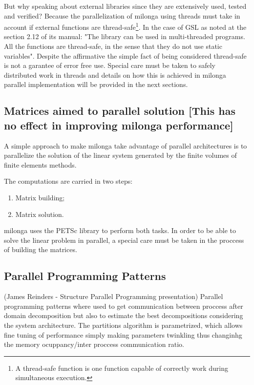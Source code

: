 \documentclass{anstrans}
\begin{document}
But why speaking about external libraries since they are extensively used, tested and verified? Because
the parallelization of milonga using threads must take in account if external functions are
thread-safe\footnote{A thread-safe function is one function capable of correctly work during simultaneous
  execution.}. In the case of GSL as noted at the section 2.12 of its manual: "The library can be used in multi-threaded programs. All the functions are thread-safe, in the sense that they do not use static variables". Despite the affirmative the
simple fact of being considered thread-safe is not a garantee of error free use. Special care must be taken to safely
distributed work in threads and details on how this is achieved in milonga parallel implementation will be provided
in the next sections.

\subsection{Matrices aimed to parallel solution [This has no effect in improving milonga performance]}
A simple approach to make milonga take advantage of parallel architectures is to parallelize the
solution of the linear system generated by the finite volumes of finite elements methods.

The computations are carried in two steps:
\begin{enumerate}
\item Matrix building;
  \item Matrix solution.
\end{enumerate}

milonga uses the PETSc library to perform both tasks. In order to be able to solve the linear problem
in parallel, a special care must be taken in the proccess of building the matrices.


\subsection{Parallel Programming Patterns}
(James Reinders - Structure Parallel Programming presentation)
Parallel programming patterns where used to get communication between proccess after
domain decomposition but also to estimate the best decompositions considering the system
architecture. The partitions algorithm is parametrized, which allows fine tuning of performance
simply making parameters twinkling thus changinhg the memory ocuppancy/inter proccess communication ratio.
\end{document}
